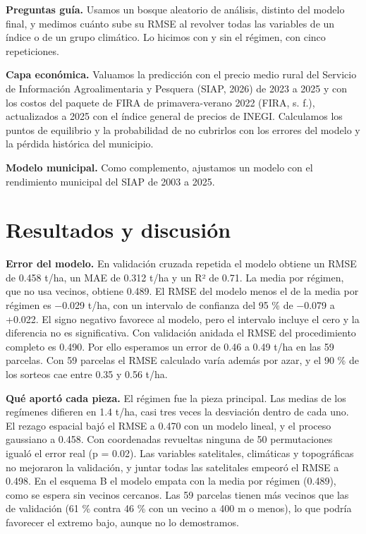 \documentclass[11pt,letterpaper]{article}
\begin{document}
\textbf{Preguntas guía.} Usamos un bosque aleatorio de análisis, distinto del modelo final, y medimos cuánto sube su RMSE al revolver todas las variables de un índice o de un grupo climático. Lo hicimos con y sin el régimen, con cinco repeticiones.

\textbf{Capa económica.} Valuamos la predicción con el precio medio rural del Servicio de Información Agroalimentaria y Pesquera (SIAP, 2026) de 2023 a 2025 y con los costos del paquete de FIRA de primavera-verano 2022 (FIRA, s. f.), actualizados a 2025 con el índice general de precios de INEGI. Calculamos los puntos de equilibrio y la probabilidad de no cubrirlos con los errores del modelo y la pérdida histórica del municipio.

\textbf{Modelo municipal.} Como complemento, ajustamos un modelo con el rendimiento municipal del SIAP de 2003 a 2025.

\section{Resultados y discusión}

\textbf{Error del modelo.} En validación cruzada repetida el modelo obtiene un RMSE de 0.458 t/ha, un MAE de 0.312 t/ha y un R² de 0.71. La media por régimen, que no usa vecinos, obtiene 0.489. El RMSE del modelo menos el de la media por régimen es −0.029 t/ha, con un intervalo de confianza del 95 \% de −0.079 a +0.022. El signo negativo favorece al modelo, pero el intervalo incluye el cero y la diferencia no es significativa. Con validación anidada el RMSE del procedimiento completo es 0.490. Por ello esperamos un error de 0.46 a 0.49 t/ha en las 59 parcelas. Con 59 parcelas el RMSE calculado varía además por azar, y el 90 \% de los sorteos cae entre 0.35 y 0.56 t/ha.

\textbf{Qué aportó cada pieza.} El régimen fue la pieza principal. Las medias de los regímenes difieren en 1.4 t/ha, casi tres veces la desviación dentro de cada uno. El rezago espacial bajó el RMSE a 0.470 con un modelo lineal, y el proceso gaussiano a 0.458. Con coordenadas revueltas ninguna de 50 permutaciones igualó el error real (p = 0.02). Las variables satelitales, climáticas y topográficas no mejoraron la validación, y juntar todas las satelitales empeoró el RMSE a 0.498. En el esquema B el modelo empata con la media por régimen (0.489), como se espera sin vecinos cercanos. Las 59 parcelas tienen más vecinos que las de validación (61 \% contra 46 \% con un vecino a 400 m o menos), lo que podría favorecer el extremo bajo, aunque no lo demostramos.
\end{document}
